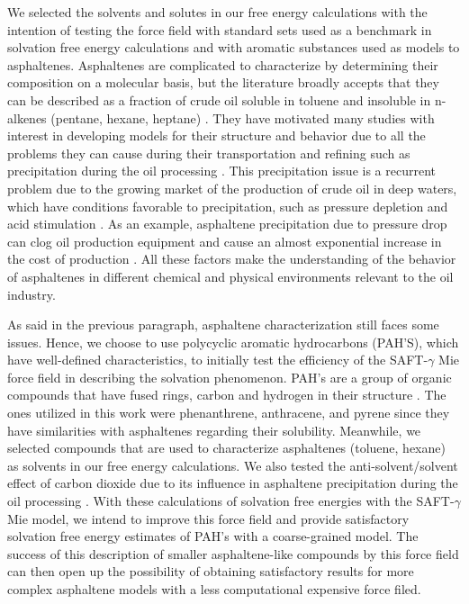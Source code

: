 We selected the solvents and solutes in our free energy calculations with the intention of testing the force field with standard sets used as a benchmark in solvation free energy calculations and with aromatic substances used as models to asphaltenes. Asphaltenes are complicated to characterize by determining their composition on a molecular basis, but the literature broadly accepts that they can be described as a fraction of crude oil soluble in toluene and insoluble in n-alkenes (pentane, hexane, heptane) \cite{SJOBLOM2003399}. They have motivated many studies with interest in developing models for their structure and behavior due to all the problems they can cause during their transportation and refining such as precipitation during the oil processing \cite{SJOBLOM20151}. This precipitation issue is a recurrent problem due to the growing market of the production of crude oil in deep waters, which have conditions favorable to precipitation, such as pressure depletion and acid stimulation \cite{AIC:AIC10243}. As an example, asphaltene precipitation due to pressure drop can clog oil production equipment and cause an almost exponential increase in the cost of production \cite{doi:10.1021/ef010047l}. All these factors make the understanding of the behavior of asphaltenes in different chemical and physical environments relevant to the oil industry. 

As said in the previous paragraph, asphaltene characterization still faces some issues. Hence, we choose to use polycyclic aromatic hydrocarbons (PAH'S), which have well-defined characteristics, to initially test the efficiency of the SAFT-$\gamma$ Mie force field in describing the solvation phenomenon. PAH's are a group of organic compounds that have fused rings, carbon and hydrogen in their structure \cite{RAVINDRA20082895}. The ones utilized in this work were phenanthrene, anthracene, and pyrene since they have similarities with asphaltenes regarding their solubility. Meanwhile,  we selected compounds that are used to characterize asphaltenes (toluene, hexane) as solvents in our free energy calculations. We also tested the anti-solvent/solvent effect of carbon dioxide due to its influence in asphaltene precipitation during the oil processing \cite{SOROUSH2014405}. With these calculations of solvation free energies with the SAFT-$\gamma$ Mie model, we intend to improve this force field and provide satisfactory solvation free energy estimates of PAH's with a coarse-grained model. The success of this description of smaller asphaltene-like compounds by this force field can then open up the possibility of obtaining satisfactory results for more complex asphaltene models with a less computational expensive force filed.

